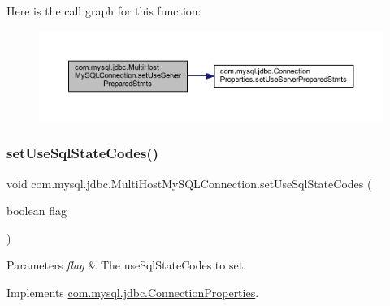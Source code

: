 Here is the call graph for this function\+:
\nopagebreak
\begin{figure}[H]
\begin{center}
\leavevmode
\includegraphics[width=350pt]{classcom_1_1mysql_1_1jdbc_1_1_multi_host_my_s_q_l_connection_a94135430993c4b5420c93a25e97f2012_cgraph}
\end{center}
\end{figure}
\mbox{\label{classcom_1_1mysql_1_1jdbc_1_1_multi_host_my_s_q_l_connection_a71f99bc9ca78dfeaa258b42946f7f2fd}} 
\subsubsection{\texorpdfstring{set\+Use\+Sql\+State\+Codes()}{setUseSqlStateCodes()}}
{\footnotesize\ttfamily void com.\+mysql.\+jdbc.\+Multi\+Host\+My\+S\+Q\+L\+Connection.\+set\+Use\+Sql\+State\+Codes (\begin{DoxyParamCaption}\item[{boolean}]{flag }\end{DoxyParamCaption})}


\begin{DoxyParams}{Parameters}
{\em flag} & The use\+Sql\+State\+Codes to set. \\
\hline
\end{DoxyParams}


Implements \mbox{\hyperlink{interfacecom_1_1mysql_1_1jdbc_1_1_connection_properties_a479e40c9b5781e950ec3fca32646964b}{com.\+mysql.\+jdbc.\+Connection\+Properties}}.

